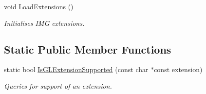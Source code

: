 \begin{DoxyCompactItemize}
\item 
void \hyperlink{class_c_p_v_r_tgles_ext_a9b93b2f9614fe46f5fb7d2548db460c6}{Load\+Extensions} ()
\begin{DoxyCompactList}\small\item\em Initialises I\+M\+G extensions. \end{DoxyCompactList}\end{DoxyCompactItemize}
\subsection*{Static Public Member Functions}
\begin{DoxyCompactItemize}
\item 
static bool \hyperlink{class_c_p_v_r_tgles_ext_adc911195e9221d8d8e9e023a0cf44611}{Is\+G\+L\+Extension\+Supported} (const char $\ast$const extension)
\begin{DoxyCompactList}\small\item\em Queries for support of an extension. \end{DoxyCompactList}\end{DoxyCompactItemize}

